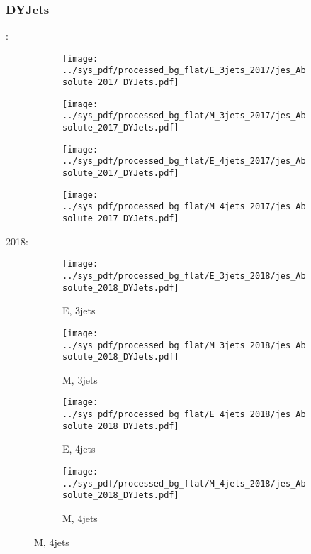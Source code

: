 \documentclass{beamer}
\begin{document}
\begin{frame}
\frametitle{DYJets}
\fontsize{5}{1}:
\begin{figure}
\centering
\begin{subfigure}[b]{0.24\textwidth}
\texttt{[image: ../sys\_pdf/processed\_bg\_flat/E\_3jets\_2017/jes\_Absolute\_2017\_DYJets.pdf]}
\end{subfigure}
\begin{subfigure}[b]{0.24\textwidth}
\texttt{[image: ../sys\_pdf/processed\_bg\_flat/M\_3jets\_2017/jes\_Absolute\_2017\_DYJets.pdf]}
\end{subfigure}
\begin{subfigure}[b]{0.24\textwidth}
\texttt{[image: ../sys\_pdf/processed\_bg\_flat/E\_4jets\_2017/jes\_Absolute\_2017\_DYJets.pdf]}
\end{subfigure}
\begin{subfigure}[b]{0.24\textwidth}
\texttt{[image: ../sys\_pdf/processed\_bg\_flat/M\_4jets\_2017/jes\_Absolute\_2017\_DYJets.pdf]}
\end{subfigure}
\end{figure}
2018:
\begin{figure}
\centering
\begin{subfigure}[b]{0.24\textwidth}
\texttt{[image: ../sys\_pdf/processed\_bg\_flat/E\_3jets\_2018/jes\_Absolute\_2018\_DYJets.pdf]}
\captionsetup{font=tiny}
\caption{E, 3jets}
\end{subfigure}
\begin{subfigure}[b]{0.24\textwidth}
\texttt{[image: ../sys\_pdf/processed\_bg\_flat/M\_3jets\_2018/jes\_Absolute\_2018\_DYJets.pdf]}
\captionsetup{font=tiny}
\caption{M, 3jets}
\end{subfigure}
\begin{subfigure}[b]{0.24\textwidth}
\texttt{[image: ../sys\_pdf/processed\_bg\_flat/E\_4jets\_2018/jes\_Absolute\_2018\_DYJets.pdf]}
\captionsetup{font=tiny}
\caption{E, 4jets}
\end{subfigure}
\begin{subfigure}[b]{0.24\textwidth}
\texttt{[image: ../sys\_pdf/processed\_bg\_flat/M\_4jets\_2018/jes\_Absolute\_2018\_DYJets.pdf]}
\captionsetup{font=tiny}
\caption{M, 4jets}
\end{subfigure}
\end{figure}
\end{frame}
\end{document}
